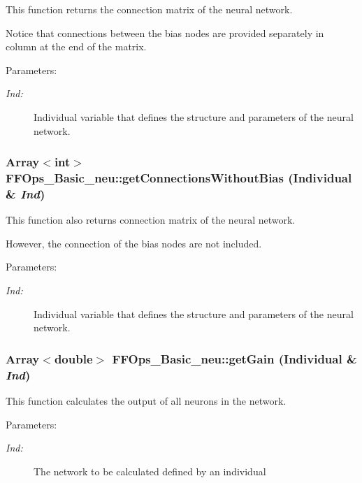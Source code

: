 This function returns the connection matrix of the neural network.

Notice that connections between the bias nodes are provided separately in column  at the end of the matrix. \begin{Desc}
\item[Parameters: ]\par
\begin{description}
\item[{\em 
Ind:}]Individual variable that defines the structure and parameters of the neural network. \end{description}
\end{Desc}
\subsubsection{\setlength{\rightskip}{0pt plus 5cm}Array$<$int$>$ FFOps\_\-Basic\_\-neu::get\-Connections\-Without\-Bias (Individual \& {\em Ind})}\label{classFFOps__Basic__neu_a2}


This function also returns connection matrix of the neural network.

However, the connection of the bias nodes are not included. \begin{Desc}
\item[Parameters: ]\par
\begin{description}
\item[{\em 
Ind:}]Individual variable that defines the structure and parameters of the neural network. \end{description}
\end{Desc}
\subsubsection{\setlength{\rightskip}{0pt plus 5cm}Array$<$double$>$ FFOps\_\-Basic\_\-neu::get\-Gain (Individual \& {\em Ind})}\label{classFFOps__Basic__neu_a8}


This function calculates the output of all neurons in the network.

\begin{Desc}
\item[Parameters: ]\par
\begin{description}
\item[{\em 
Ind:}]The network to be calculated defined by an individual \end{description}
\end{Desc}
